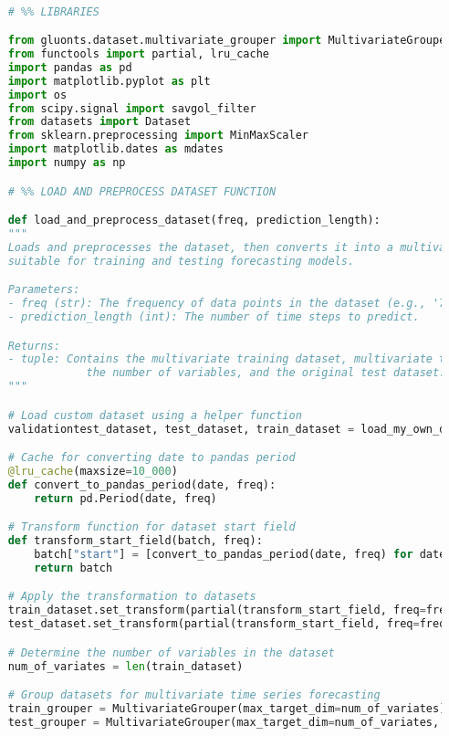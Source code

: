 \begin{lstlisting}[language=Python, caption={Code for loading and preprocessing the time series data}, breaklines=true, label=code2]

    # %% LIBRARIES

    from gluonts.dataset.multivariate_grouper import MultivariateGrouper
    from functools import partial, lru_cache
    import pandas as pd
    import matplotlib.pyplot as plt
    import os
    from scipy.signal import savgol_filter
    from datasets import Dataset
    from sklearn.preprocessing import MinMaxScaler
    import matplotlib.dates as mdates
    import numpy as np

    # %% LOAD AND PREPROCESS DATASET FUNCTION

    def load_and_preprocess_dataset(freq, prediction_length):
    """
    Loads and preprocesses the dataset, then converts it into a multivariate time series
    suitable for training and testing forecasting models.

    Parameters:
    - freq (str): The frequency of data points in the dataset (e.g., '7min52s').
    - prediction_length (int): The number of time steps to predict.

    Returns:
    - tuple: Contains the multivariate training dataset, multivariate testing dataset,
                the number of variables, and the original test dataset.
    """

    # Load custom dataset using a helper function
    validationtest_dataset, test_dataset, train_dataset = load_my_own_dataset(prediction_length)

    # Cache for converting date to pandas period
    @lru_cache(maxsize=10_000)
    def convert_to_pandas_period(date, freq):
        return pd.Period(date, freq)

    # Transform function for dataset start field
    def transform_start_field(batch, freq):
        batch["start"] = [convert_to_pandas_period(date, freq) for date in batch["start"]]
        return batch

    # Apply the transformation to datasets
    train_dataset.set_transform(partial(transform_start_field, freq=freq))
    test_dataset.set_transform(partial(transform_start_field, freq=freq))

    # Determine the number of variables in the dataset
    num_of_variates = len(train_dataset)

    # Group datasets for multivariate time series forecasting
    train_grouper = MultivariateGrouper(max_target_dim=num_of_variates)
    test_grouper = MultivariateGrouper(max_target_dim=num_of_variates, num_test_dates=len(test_dataset) // num_of_variates)


\end{lstlisting}
